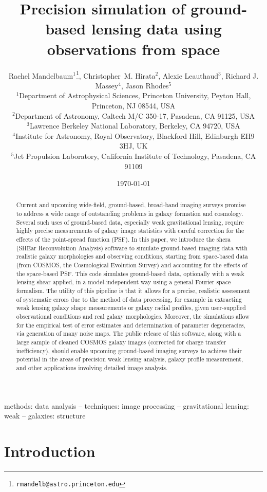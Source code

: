 \documentclass[twocolumn,useAMS,usenatbib]{mn2e}
\title[Ground-based image simulation]{Precision simulation of
  ground-based lensing data using observations from space}
\author[Mandelbaum et al.]
{Rachel Mandelbaum$^1$\thanks{\tt rmandelb@astro.princeton.edu}, 
Christopher~M. Hirata$^2$,
Alexie Leauthaud$^3$, 
\newauthor
Richard J. Massey$^4$, Jason Rhodes$^5$
\\$^1$Department of Astrophysical Sciences, Princeton University,
Peyton Hall, Princeton, NJ 08544, USA
\\$^2$Department of Astronomy, Caltech M/C 350-17, Pasadena, CA 91125, USA
\\$^3$Lawrence Berkeley National Laboratory, Berkeley, CA 94720, USA
\\$^4$Institute for Astronomy, Royal Observatory, Blackford Hill, Edinburgh EH9 3HJ, UK
\\$^5$Jet Propulsion Laboratory, California Institute of Technology,
Pasadena, CA 91109
}
\date{\today}
\begin{document}
\maketitle

\begin{abstract}
  Current and upcoming wide-field, ground-based, broad-band imaging
  surveys promise to address a wide range of outstanding problems in
  galaxy formation and cosmology.  Several such uses of ground-based
  data, especially weak gravitational lensing, require highly precise
  measurements of galaxy image statistics with careful correction for
  the effects of the point-spread function (PSF).  In this paper, we
  introduce the {\sc shera} (SHEar Reconvolution Analysis) software to
  simulate ground-based imaging data with realistic galaxy
  morphologies and observing conditions, starting from space-based
  data (from COSMOS, the Cosmological Evolution Survey) and accounting
  for the effects of the space-based PSF.  This code simulates
  ground-based data, optionally with a weak lensing shear applied, in
  a model-independent way using a general Fourier space formalism.
  The utility of this pipeline is that it allows for a precise,
  realistic assessment of systematic errors due to the method of data
  processing, for example in extracting weak lensing galaxy shape
  measurements or galaxy radial profiles, given user-supplied
  observational conditions and real galaxy morphologies.  Moreover, the simulations
  allow for the empirical test of error estimates and determination of
  parameter degeneracies, via generation of many noise maps. The 
  public release of this software, along with a large sample of
  cleaned COSMOS galaxy images (corrected for charge transfer
  inefficiency), should enable upcoming ground-based imaging surveys
  to achieve their potential in the areas of precision weak lensing
  analysis, galaxy profile measurement, and other applications involving
  detailed image analysis.
\end{abstract}

\begin{keywords}
  methods: data analysis -- techniques: image processing --
  gravitational lensing: weak -- galaxies: structure
\end{keywords}

\section{Introduction}
\label{S:intro}
\end{document}
